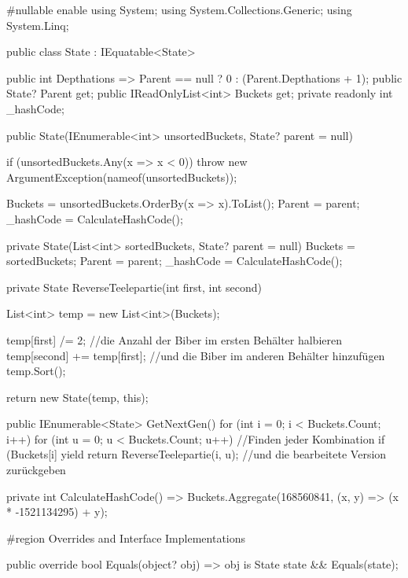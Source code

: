 \documentclass[a4paper,10pt,ngerman]{scrartcl}
\begin{document}
\begin{lstcs}
#nullable enable 
    using System;
    using System.Collections.Generic;
    using System.Linq;

    public class State : IEquatable<State>
    {
        public int Depthations => Parent == null ? 0 : (Parent.Depthations + 1);
        public State? Parent { get; }
        public IReadOnlyList<int> Buckets { get; }
        private readonly int _hashCode;

        public State(IEnumerable<int> unsortedBuckets, State? parent = null)
        {
            if (unsortedBuckets.Any(x => x < 0)) throw new ArgumentException(nameof(unsortedBuckets));

            Buckets = unsortedBuckets.OrderBy(x => x).ToList();
            Parent = parent;
            _hashCode = CalculateHashCode();
        }

        private State(List<int> sortedBuckets, State? parent = null)
        {
            Buckets = sortedBuckets;
            Parent = parent;
            _hashCode = CalculateHashCode();
        }

        private State ReverseTeelepartie(int first, int second)
        {
            List<int> temp = new List<int>(Buckets);

            temp[first] /= 2;               //die Anzahl der Biber im ersten Behälter halbieren
            temp[second] += temp[first];    //und die Biber im anderen Behälter hinzufügen
            temp.Sort();

            return new State(temp, this);
        }

        public IEnumerable<State> GetNextGen()
        {
            for (int i = 0; i < Buckets.Count; i++)
            {
                for (int u = 0; u < Buckets.Count; u++) //Finden jeder Kombination
                {
                    if (Buckets[i] %
                    {
                        yield return ReverseTeelepartie(i, u);  //und die bearbeitete Version zurückgeben
                    }
                }
            }
        }

        private int CalculateHashCode() =>
            Buckets.Aggregate(168560841, (x, y) => (x * -1521134295) + y);

        #region Overrides and Interface Implementations

        public override bool Equals(object? obj) => obj is State state && Equals(state);

}
\end{lstcs}
\end{document}
